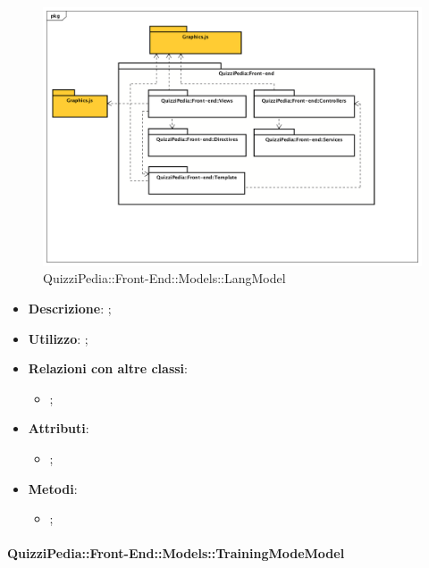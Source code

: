 			\begin{figure}[h]
				\centering
				\includegraphics[scale=0.5,keepaspectratio]{UML/Package/QuizziPedia_Front-end.png}
				\caption{QuizziPedia::Front-End::Models::LangModel}
			\end{figure}
			
			\begin{itemize}
				\item \textbf{Descrizione}: ;
				\item \textbf{Utilizzo}: ;
				\item \textbf{Relazioni con altre classi}: 
				\begin{itemize}
					\item ;
				\end{itemize}
				\item \textbf{Attributi}: 
				\begin{itemize}
					\item ;
				\end{itemize}
				\item \textbf{Metodi}: 
				\begin{itemize}
					\item ;
				\end{itemize}
			\end{itemize}
		
		\paragraph{QuizziPedia::Front-End::Models::TrainingModeModel}
		
			\label{QuizziPedia::Front-End::Models::TrainingModeModel}
			

